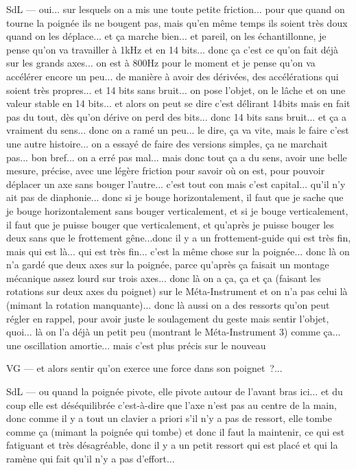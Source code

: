 SdL — oui... sur lesquels on a mis une toute petite friction... pour que quand on tourne la poignée ils ne bougent pas, mais qu'en même temps ils soient très doux quand on les déplace... et ça marche bien... et pareil, on les échantillonne, je pense qu'on va travailler à 1kHz et en 14 bits... donc ça c'est ce qu'on fait déjà sur les grands axes... on est à 800Hz pour le moment et je pense qu'on va accélérer encore un peu... de manière à avoir des dérivées, des accélérations qui soient très propres... et 14 bits sans bruit... on pose l'objet, on le lâche et on une valeur stable en 14 bits... et alors on peut se dire c'est délirant 14bits mais en fait pas du tout, dès qu'on dérive on perd des bits... donc 14 bits sans bruit... et ça a vraiment du sens... donc on a ramé un peu... le dire, ça va vite, mais le faire c'est une autre histoire... on a essayé de faire des versions simples, ça ne marchait pas... bon bref... on a erré pas mal... mais donc tout ça a du sens, avoir une belle mesure, précise, avec une légère friction pour savoir où on est, pour pouvoir déplacer un axe sans bouger l'autre... c'est tout con mais c'est capital... qu'il n'y ait pas de diaphonie... donc si je bouge horizontalement, il faut que je sache que je bouge horizontalement sans bouger verticalement, et si je bouge verticalement, il faut que je puisse bouger que verticalement, et qu'après je puisse bouger les deux sans que le frottement gêne...donc il y a un frottement-guide qui est très fin, mais qui est là... qui est très fin... c'est la même chose sur la poignée... donc là on n'a gardé que deux axes sur la poignée, parce qu'après ça faisait un montage mécanique assez lourd sur trois axes... donc là on a ça, ça et ça (faisant les rotations sur deux axes du poignet) sur le Méta-Instrument et on n'a pas celui là (mimant la rotation manquante)... donc là aussi on a des ressorts qu'on peut régler en rappel, pour avoir juste le soulagement du geste mais sentir l'objet, quoi... là on l'a déjà un petit peu (montrant le Méta-Instrument 3) comme ça... une oscillation amortie... mais c'est plus précis sur le nouveau 

VG — et alors sentir qu'on exerce une force dans son poignet ?... 

SdL — ou quand la poignée pivote, elle pivote autour de l'avant bras ici... et du coup elle est déséquilibrée c'est-à-dire que l'axe n'est pas au centre de la main, donc comme il y a tout un clavier a priori s'il n'y a pas de ressort, elle tombe comme ça (mimant la poignée qui tombe) et donc il faut la maintenir, ce qui est fatiguant et très désagréable, donc il y a un petit ressort qui est placé et qui la ramène qui fait qu'il n'y a pas d'effort... 

